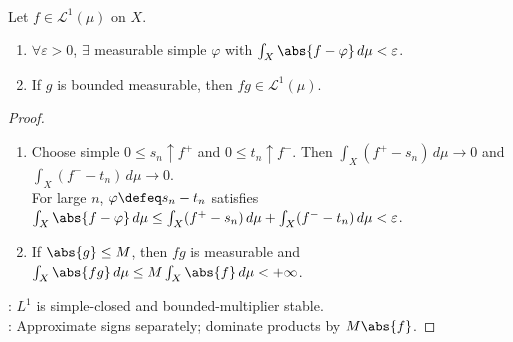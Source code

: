 \begin{proposition} \label{prop:l1-simple-approximation-and-bounded-multipliers} \\
Let $f\in\mathscr{L}^1(\mu)$ on $X$.
\begin{enumerate}[label=(\roman*)]
\setlength{\itemsep}{0pt}
\item $\forall\varepsilon>0$, $\exists$ measurable simple $\varphi$ with $\int_X\abs{f-\varphi}\,d\mu<\varepsilon$.
\item If $g$ is bounded measurable, then $fg\in\mathscr{L}^1(\mu)$.
\end{enumerate}
\begin{proof}
\begin{enumerate}[label=(\roman*)]
\setlength{\itemsep}{0pt}
\item Choose simple $0\leq s_n\uparrow f^+$ and $0\leq t_n\uparrow f^-$. Then $\int_X(f^+-s_n)\,d\mu\to0$ and $\int_X(f^--t_n)\,d\mu\to0$.\\
For large $n$, $\varphi\defeq s_n-t_n$ satisfies $\int_X\abs{f-\varphi}\,d\mu\leq\int_X(f^+-s_n)\,d\mu+\int_X(f^--t_n)\,d\mu<\varepsilon$.
\item If $\abs{g}\leq M$, then $fg$ is measurable and $\int_X\abs{fg}\,d\mu\leq M\int_X\abs{f}\,d\mu<+\infty$.
\end{enumerate}
: $L^1$ is simple-closed and bounded-multiplier stable.\\
: Approximate signs separately; dominate products by $M\abs{f}$.
\end{proof}
\end{proposition}

